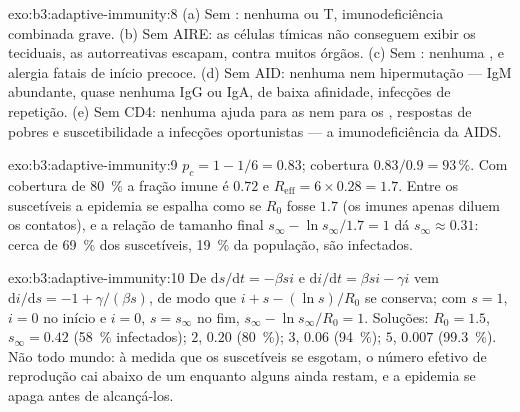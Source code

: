 \begin{solution}{exo:b3:adaptive-immunity:8}
(a) Sem : nenhuma  ou T, imunodeficiência
combinada grave. (b) Sem AIRE: as células tímicas não conseguem exibir
os  teciduais, as  autorreativas escapam,
 contra muitos órgãos. (c) Sem : nenhuma ,  e alergia fatais de início precoce. (d) Sem
AID: nenhuma  nem hipermutação --- IgM abundante, quase
nenhuma IgG ou IgA,  de baixa afinidade, infecções de
repetição. (e) Sem  CD4: nenhuma ajuda para as  nem
para os , respostas de  pobres e suscetibilidade a
infecções oportunistas --- a imunodeficiência da AIDS.
\end{solution}

\begin{solution}{exo:b3:adaptive-immunity:9}
$p_{c} = 1 - 1/6 = 0.83$; cobertura $0.83/0.9 = 93\,\%$. Com cobertura
de \qty{80}{\%} a fração imune é $0.72$ e $R_{\text{eff}} = 6\times 0.28
= 1.7$. Entre os suscetíveis a epidemia se espalha como se $R_{0}$
fosse $1.7$ (os imunes apenas diluem os contatos), e a relação de
tamanho final $s_{\infty} - \ln s_{\infty}/1.7 = 1$ dá $s_{\infty}
\approx 0.31$: cerca de \qty{69}{\%} dos suscetíveis, \qty{19}{\%} da
população, são infectados.
\end{solution}

\begin{solution}{exo:b3:adaptive-immunity:10}
De $\mathrm{d}s/\mathrm{d}t = -\beta si$ e $\mathrm{d}i/\mathrm{d}t
= \beta si - \gamma i$ vem $\mathrm{d}i/\mathrm{d}s = -1 + \gamma/(\beta s)$,
de modo que $i + s - (\ln s)/R_{0}$ se conserva; com $s = 1$, $i = 0$ no
início e $i = 0$, $s = s_{\infty}$ no fim, $s_{\infty} - \ln
s_{\infty}/R_{0} = 1$. Soluções: $R_{0} = 1.5$, $s_{\infty} = 0.42$
(\qty{58}{\%} infectados); $2$, $0.20$ (\qty{80}{\%}); $3$, $0.06$
(\qty{94}{\%}); $5$, $0.007$ (\qty{99.3}{\%}). Não todo mundo: à medida
que os suscetíveis se esgotam, o número efetivo de reprodução cai abaixo
de um enquanto alguns ainda restam, e a epidemia se apaga antes de
alcançá-los.
\end{solution}

